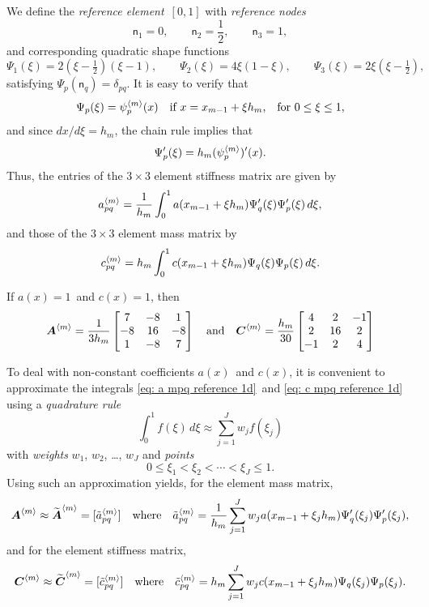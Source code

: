 We define the \emph{reference element}~$[0,1]$ with \emph{reference nodes}
\[
\mathsf{n}_1=0,\qquad\mathsf{n}_2=\frac{1}{2},\qquad\mathsf{n}_3=1,
\]
and corresponding quadratic shape functions
\begin{equation}\label{eq: quadratic shape funcs 1d}
\Psi_1(\xi)=2(\xi-\tfrac12)(\xi-1),\qquad
\Psi_2(\xi)=4\xi(1-\xi),\qquad
\Psi_3(\xi)=2\xi(\xi-\tfrac12),
\end{equation}
satisfying $\Psi_p(\mathsf{n}_q)=\delta_{pq}$.  It is easy to verify that
\[
\Psi_p(\xi)=\psi^{\langle m\rangle}_p(x)\quad
	\text{if $x=x_{m-1}+\xi h_m$,}\quad\text{for $0\le\xi\le1$,}
\]
and since $dx/d\xi=h_m$, the chain rule implies that
\[
\Psi'_p(\xi)=h_m(\psi^{\langle m\rangle}_p)'(x).
\]
Thus, the entries of the $3\times3$ element stiffness matrix are given by
\begin{equation}\label{eq: a mpq reference 1d}
a^{\langle m\rangle}_{pq}=\frac{1}{h_m}\int_0^1a(x_{m-1}+\xi h_m)
	\Psi'_q(\xi)\Psi'_p(\xi)\,d\xi,
\end{equation}
and those of the $3\times3$ element mass matrix by
\begin{equation}\label{eq: c mpq reference 1d}
c^{\langle m\rangle}_{pq}=h_m\int_0^1c(x_{m-1}+\xi h_m)
	\Psi_q(\xi)\Psi_p(\xi)\,d\xi.
\end{equation}

\begin{example}
If $a(x)=1$~and $c(x)=1$, then
\begin{equation}\label{eq: element matrices quadratic 1d}
\boldsymbol{A}^{\langle m\rangle}=\frac{1}{3h_m}\begin{bmatrix}
 7&-8& 1\\
-8&16&-8\\
 1&-8& 7\end{bmatrix}
\quad\text{and}\quad
\boldsymbol{C}^{\langle m\rangle}=\frac{h_m}{30}\begin{bmatrix}
 4& 2&-1\\
 2&16& 2\\
-1& 2& 4 \end{bmatrix}
\end{equation}
\end{example}

To deal with non-constant coefficients $a(x)$~and $c(x)$, it is convenient to 
approximate the integrals \eqref{eq: a mpq reference 1d}~and
\eqref{eq: c mpq reference 1d} using a \emph{quadrature rule}
\[
\int_0^1 f(\xi)\,d\xi\approx\sum_{j=1}^J w_jf(\xi_j)
\]
with \emph{weights} $w_1$, $w_2$, \dots, $w_J$ and \emph{points}
\[
0\le\xi_1<\xi_2<\cdots<\xi_J\le1.
\]
Using such an approximation yields, for the element mass matrix,
\[
\boldsymbol{A}^{\langle m\rangle}\approx
	\widetilde{\boldsymbol{A}}^{\langle m\rangle}=[\tilde a_{pq}^{\langle m\rangle}]
\quad\text{where}\quad
\tilde a^{\langle m\rangle}_{pq}=\frac{1}{h_m}\sum_{j=1}^Jw_ja(x_{m-1}+\xi_jh_m)
	\Psi'_q(\xi_j)\Psi'_p(\xi_j),
\]
and for the element stiffness matrix,
\[
\boldsymbol{C}^{\langle m\rangle}\approx
	\widetilde{\boldsymbol{C}}^{\langle m\rangle}=[\tilde c_{pq}^{\langle m\rangle}]
\quad\text{where}\quad
\tilde c^{\langle m\rangle}_{pq}=h_m\sum_{j=1}^Jw_jc(x_{m-1}+\xi_jh_m)
	\Psi_q(\xi_j)\Psi_p(\xi_j).
\]

